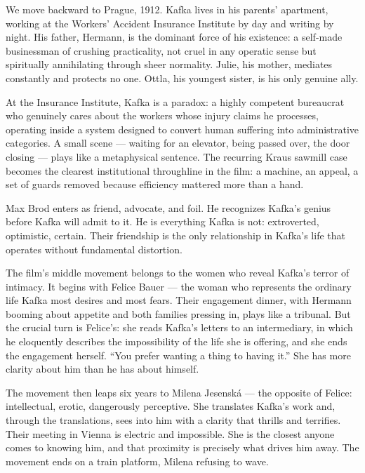 We move backward to Prague, 1912. Kafka lives in his parents' apartment, working at the Workers' Accident Insurance Institute by day and writing by night. His father, Hermann, is the dominant force of his existence: a self-made businessman of crushing practicality, not cruel in any operatic sense but spiritually annihilating through sheer normality. Julie, his mother, mediates constantly and protects no one. Ottla, his youngest sister, is his only genuine ally.

At the Insurance Institute, Kafka is a paradox: a highly competent bureaucrat who genuinely cares about the workers whose injury claims he processes, operating inside a system designed to convert human suffering into administrative categories. A small scene --- waiting for an elevator, being passed over, the door closing --- plays like a metaphysical sentence. The recurring Kraus sawmill case becomes the clearest institutional throughline in the film: a machine, an appeal, a set of guards removed because efficiency mattered more than a hand.

Max Brod enters as friend, advocate, and foil. He recognizes Kafka's genius before Kafka will admit to it. He is everything Kafka is not: extroverted, optimistic, certain. Their friendship is the only relationship in Kafka's life that operates without fundamental distortion.

The film's middle movement belongs to the women who reveal Kafka's terror of intimacy. It begins with Felice Bauer --- the woman who represents the ordinary life Kafka most desires and most fears. Their engagement dinner, with Hermann booming about appetite and both families pressing in, plays like a tribunal. But the crucial turn is Felice's: she reads Kafka's letters to an intermediary, in which he eloquently describes the impossibility of the life she is offering, and she ends the engagement herself. ``You prefer wanting a thing to having it.'' She has more clarity about him than he has about himself.

The movement then leaps six years to Milena Jesenská --- the opposite of Felice: intellectual, erotic, dangerously perceptive. She translates Kafka's work and, through the translations, sees into him with a clarity that thrills and terrifies. Their meeting in Vienna is electric and impossible. She is the closest anyone comes to knowing him, and that proximity is precisely what drives him away. The movement ends on a train platform, Milena refusing to wave.


